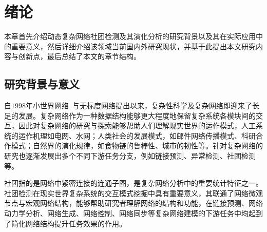 
\baselineskip 20pt

\chapter{绪论}
\label{chap:1}

本章首先介绍动态复杂网络社团检测及其演化分析的研究背景以及其在实际应用中的重要意义，然后详细介绍该领域当前国内外研究现状，并基于此提出本文研究内容与创新点，最后总结了本文的章节结构。
 


\section{研究背景与意义}




自$1998$年小世界网络~\cite{watts1998collective}与无标度网络\cite{albert1999diameter}提出以来，复杂性科学及复杂网络即迎来了长足的发展。复杂网络作为一种数据结构能够更大程度地保留复杂系统各模块间的交互，因此对复杂网络的研究与探索能够帮助人们理解现实世界的运作模式，人工系统的运作机理如电网\cite{NEURIPS2024_c7caf017}、水网\cite{orgovanyi2025geocoding}；人类社会的发展模式，如邮件网络传播模式\cite{barnes2024temporal}、科研合作模式\cite{mariani2024collective}；自然界的演化规律，如食物链的鲁棒性\cite{sanders2024ecosystem}、城市的韧性\cite{ZHANG2024114379}等。针对复杂网络的研究也逐渐发展出多个不同下游任务分支，例如链接预测\cite{NEURIPS2024_25ead0ef}、异常检测\cite{10535312}、社团检测等\cite{kumar2024community}。


社团指的是网络中紧密连接的连通子图，是复杂网络分析中的重要统计特征之一。社团检测在现实世界复杂系统的交互模式挖掘中具有重要意义，其联通了网络微观节点与宏观网络结构，能够帮助研究者理解网络的结构和功能，在链接预测、网络动力学分析、网络生成、网络控制、网络同步等复杂网络建模的下游任务中均起到了简化网络结构提升任务效果的作用\cite{kumar2024community,fortunato2016community}。

